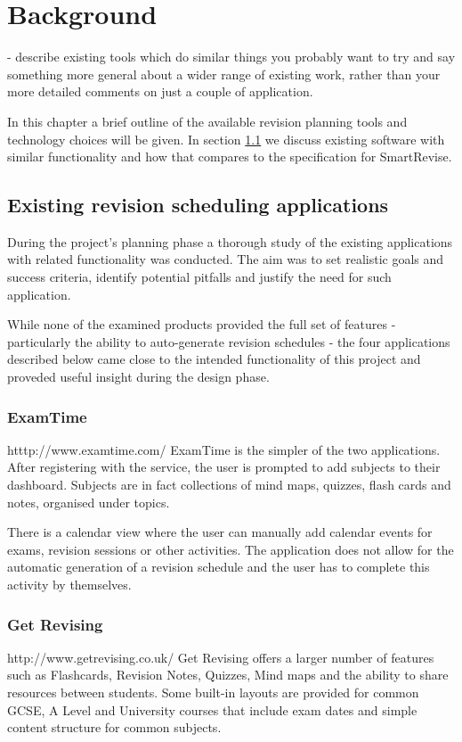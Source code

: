 \documentclass[bsc,frontabs,twoside,singlespacing,parskip]{infthesis}     %
\begin{document}
\chapter{Background}
		- describe existing tools which do similar things
		  you probably want to try and say something more general about a wider range of existing work,
		  rather than your more detailed comments on just a couple of application.

		In this chapter a brief outline of the available revision planning tools and technology choices will be given.
		In section \ref{apps} we discuss existing software with similar functionality and how that compares to the specification for SmartRevise.


	\section{Existing revision scheduling applications}\label{apps}

		During the project's planning phase a thorough study of the existing applications with related functionality was conducted. The aim was to set realistic goals and success criteria, identify potential pitfalls and justify the need for such application.

		While none of the examined products provided the full set of features - particularly the ability to auto-generate revision schedules - the four applications described below came close to the intended functionality of this project and proveded useful insight during the design phase.

		\subsection{ExamTime}
		htttp://www.examtime.com/
		ExamTime is the simpler of the two applications. After registering with the service, the user is prompted to add subjects to their dashboard. Subjects are in fact collections of mind maps, quizzes, flash cards and notes, organised under topics.

		There is a calendar view where the user can manually add calendar events for exams, revision sessions or other activities. The application does not allow for the automatic generation of a revision schedule and the user has to complete this activity by themselves.

		\subsection{Get Revising}
		http://www.getrevising.co.uk/
		Get Revising offers a larger number of features such as Flashcards, Revision Notes, Quizzes, Mind maps and the ability to share resources between students. Some built-in layouts are provided for common GCSE, A Level and University courses that include exam dates and simple content structure for common subjects.
\end{document}
